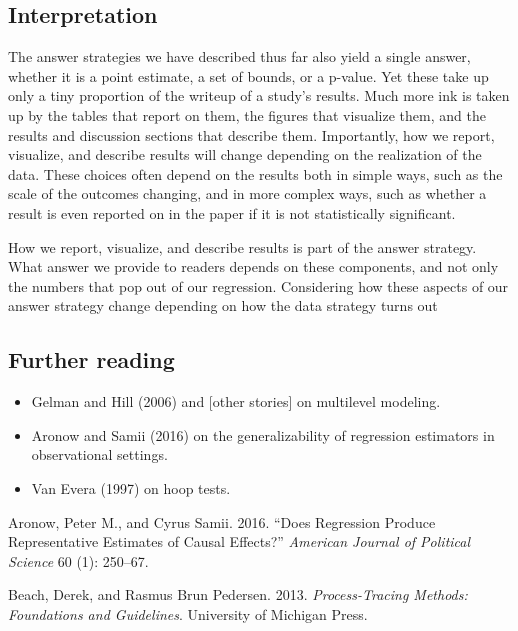 \documentclass[
]{article}
\providecommand{\tightlist}{%
  \setlength{\itemsep}{0pt}\setlength{\parskip}{0pt}}
\begin{document}
\hypertarget{interpretation}{%
\subsection{Interpretation}\label{interpretation}}

The answer strategies we have described thus far also yield a single
answer, whether it is a point estimate, a set of bounds, or a p-value.
Yet these take up only a tiny proportion of the writeup of a study's
results. Much more ink is taken up by the tables that report on them,
the figures that visualize them, and the results and discussion sections
that describe them. Importantly, how we report, visualize, and describe
results will change depending on the realization of the data. These
choices often depend on the results both in simple ways, such as the
scale of the outcomes changing, and in more complex ways, such as
whether a result is even reported on in the paper if it is not
statistically significant.

How we report, visualize, and describe results is part of the answer
strategy. What answer we provide to readers depends on these components,
and not only the numbers that pop out of our regression. Considering how
these aspects of our answer strategy change depending on how the data
strategy turns out

\hypertarget{further-reading}{%
\subsection{Further reading}\label{further-reading}}

\begin{itemize}
\tightlist
\item
  Gelman and Hill (2006) and {[}other stories{]} on multilevel modeling.
\item
  Aronow and Samii (2016) on the generalizability of regression
  estimators in observational settings.
\item
  Van Evera (1997) on hoop tests.
\end{itemize}

\hypertarget{refs}{}
\leavevmode\hypertarget{ref-aronow2016does}{}%
Aronow, Peter M., and Cyrus Samii. 2016. ``Does Regression Produce
Representative Estimates of Causal Effects?'' \emph{American Journal of
Political Science} 60 (1): 250--67.

\leavevmode\hypertarget{ref-beachpedersen2013process}{}%
Beach, Derek, and Rasmus Brun Pedersen. 2013. \emph{Process-Tracing
Methods: Foundations and Guidelines}. University of Michigan Press.
\end{document}
